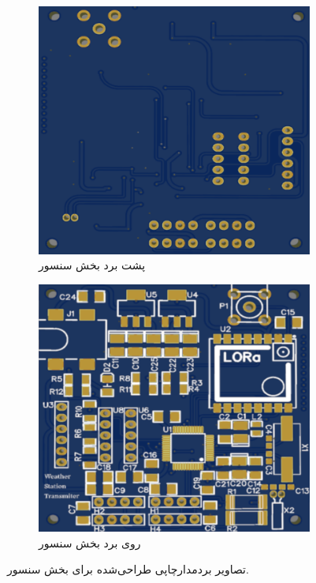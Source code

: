 \begin{figure}[H]
	\begin{subfigure}[b]{0.5\textwidth}
		\includegraphics[width=\linewidth]{Assets/transmitterBack.png}
		\caption{پشت برد بخش سنسور}
		\label{fig:transmitterBack}
	\end{subfigure}
	\begin{subfigure}[b]{0.5\textwidth}
		\includegraphics[width=\linewidth]{Assets/transmitterFront.png}
		\caption{روی برد بخش سنسور}
		\label{fig:transmitterFront}
	\end{subfigure}
	\caption{تصاویر بردمدارچاپی طراحی‌شده برای بخش سنسور.}
	\label{fig:PCB3dviewtransmitte}
\end{figure}


